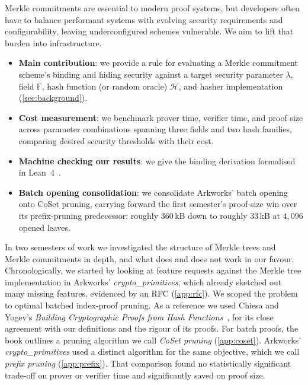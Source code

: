 \label{sec:contributions}

Merkle commitments are essential to modern proof systems, but developers often have to balance
performant systems with evolving security requirements and configurability, leaving underconfigured
schemes vulnerable. We aim to lift that burden into infrastructure.

\begin{itemize}[itemsep=0.35\baselineskip, topsep=0.35\baselineskip]
  \item \textbf{Main contribution}: we provide a rule for evaluating a Merkle commitment
  scheme's binding and hiding security against a target security parameter $\lambda$,
  field $\mathbb{F}$, hash function (or random oracle) $\mathcal{H}$, and hasher
  implementation (\cref{sec:background}).
  \item \textbf{Cost measurement}: we benchmark prover time, verifier time, and proof
  size across parameter combinations spanning three fields and two hash families,
  comparing desired security thresholds with their cost.
  \item \textbf{Machine checking our results}: we give the binding derivation formalised
  in Lean~4~\cite{ZLeanVC26}.
  \item \textbf{Batch opening consolidation}: we consolidate Arkworks' batch opening onto
  CoSet pruning, carrying forward the first semester's proof-size win over its
  prefix-pruning predecessor: roughly $360$\,kB down to roughly $33$\,kB at $4{,}096$
  opened leaves.
\end{itemize}

In two semesters of work we investigated the structure of Merkle trees and Merkle
commitments in depth, and what does and does not work in our favour.  Chronologically,
we started by looking at feature requests against the Merkle tree
implementation in Arkworks' \textit{crypto\_primitives}, which already sketched out many
missing features, evidenced by an RFC (\cref{app:rfc}).  We scoped
the problem to optimal batched index-proof pruning.  As a reference we used Chiesa and Yogev's
\emph{Building Cryptographic Proofs from Hash Functions}~\cite{CY26}, for its close
agreement with our definitions and the rigour of its proofs.  For batch proofs, the book
outlines a pruning algorithm we call \emph{CoSet pruning} (\cref{app:coset}).  Arkworks'
\textit{crypto\_primitives} used a distinct algorithm for the same objective, which we
call \emph{prefix pruning} (\cref{app:prefix}).  That comparison found no statistically
significant trade-off on prover or verifier time and significantly saved on proof size.

